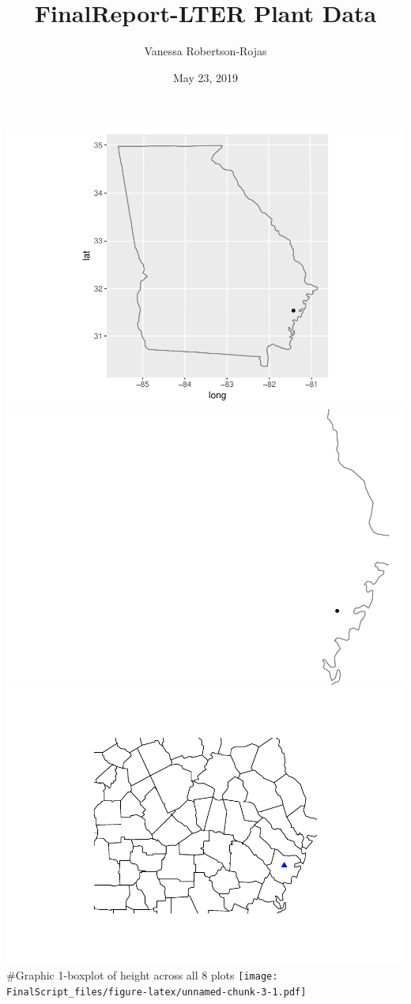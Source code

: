 \documentclass[]{article}
\title{FinalReport-LTER Plant Data}
\author{Vanessa Robertson-Rojas}
\date{May 23, 2019}
\begin{document}
\maketitle

\includegraphics{FinalScript_files/figure-latex/unnamed-chunk-2-1.pdf}
\includegraphics{FinalScript_files/figure-latex/unnamed-chunk-2-2.pdf}
\includegraphics{FinalScript_files/figure-latex/unnamed-chunk-2-3.pdf}
\#Graphic 1-boxplot of height across all 8 plots
\texttt{[image: FinalScript\_files/figure-latex/unnamed-chunk-3-1.pdf]}
\end{document}

